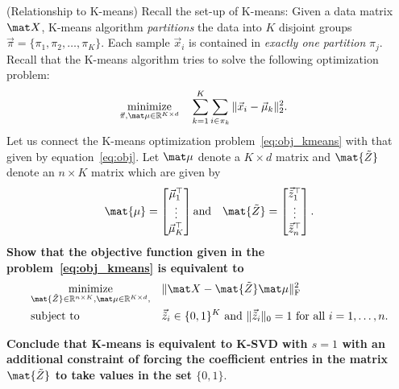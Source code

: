 \documentclass[preview]{standalone}
\begin{document}
\begin{Parts}
	\Part (Relationship to K-means) 
	Recall the set-up of K-means: Given a data matrix $\mat X$,
        K-means algorithm {\em partitions} the data into $K$ disjoint groups 
	$\vec \pi=\{\pi_1,\pi_2,\dots,\pi_K\}$. 
	Each sample $\vec x_i$ is contained in \emph{exactly one partition} $\pi_j$. 
	Recall that the K-means algorithm tries to solve the following optimization problem: 
	\begin{equation}
	\label{eq:obj_kmeans}
	\begin{aligned}
	& \underset{\vec \pi,\mat \mu\in\mathbb R^{K\times d}}{\text{minimize}}
	& & \sum_{k=1}^K\sum_{i\in\pi_k}\|\vec x_i- \vec \mu_k\|_2^2.
	\end{aligned}
	\end{equation}
	Let us connect the K-means optimization problem~\eqref{eq:obj_kmeans} with 
	that given by equation~\eqref{eq:obj}.
	Let  $\mat \mu$ denote a $K\times d$ matrix and $\mat{\tilde{Z}}$ denote an $n\times K$
	matrix which are given by
	\begin{align*}
		\mat{\mu} = \begin{bmatrix}
			\vec \mu_1^\top \\
			\vdots \\
			\vec \mu_K^\top
		\end{bmatrix}
		\text{and}\quad\mat{\tilde{Z}} = \begin{bmatrix}
			\vec{\tilde{z}}_1^\top \\
			\vdots \\
			\vec{\tilde{z}}_n^\top
		\end{bmatrix}.
	\end{align*}
	{\bf Show that the objective function given in
		the problem~\eqref{eq:obj_kmeans} is equivalent to }
	\begin{equation}
	\label{eq:obj1}
	\begin{aligned}
	& \underset{\mat{\tilde{Z}}\in\mathbb R^{n\times K}, \mat \mu\in\mathbb R^{K\times d},}{\text{minimize}}
	& & \|\mat X- \mat{\tilde{Z}} \mat \mu\|_{\text{F}}^2\\
	& \text{subject to}
	& & \vec{\tilde{z}}_i\in\{0,1\}^K  \text{ and }\|\vec{\tilde{z}}_i \|_0= 1  \text{ for all $i = 1, \ldots, n$}.
	\end{aligned}
	\end{equation}
	
	{\bf Conclude that K-means is equivalent to K-SVD with $s=1$ with an additional
		constraint of forcing the coefficient entries in the matrix $\mat{\tilde{Z}}$ to take values in the set $\{0, 1\}$}. 
	

\end{Parts}
\end{document}
